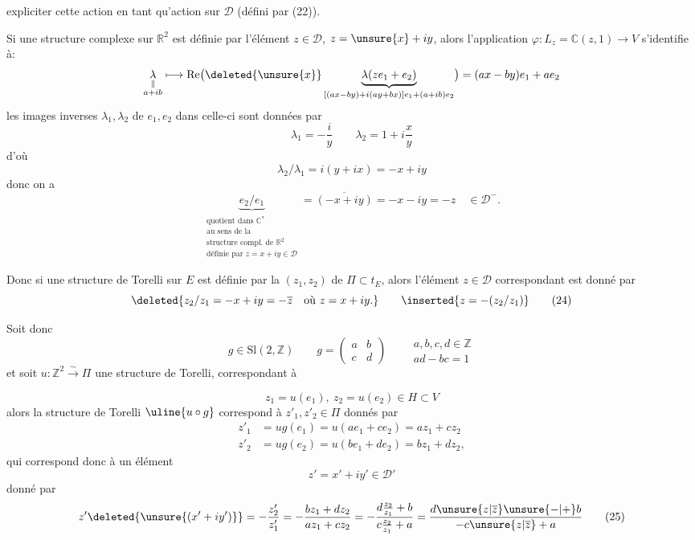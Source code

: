 expliciter cette action en tant qu'action sur $\mathcal D$ (défini par (22)).

Si une structure complexe sur $\mathbb R^2$ est définie par l'élément $z\in\mathcal D$, $z=\unsure{x}+iy$, alors l'application  $\varphi:L_z=\mathbb C(z,1)\longrightarrow V$ s'identifie à:
\[
\underset{\substack{\Vert\\a+ib}}{\lambda}\longmapsto
\operatorname{Re}\bigl(\deleted{\unsure{x}}\underbrace{\lambda(ze_1+e_2)}_{[(ax-by)+i(ay+bx)]e_1+(a+ib)e_2}\bigr)
=(ax-by)e_1+ae_2
\]
les images inverses $\lambda_1,\lambda_2$ de $e_1,e_2$ dans celle-ci sont données par
\[
\lambda_1=-\frac{i}{y}\qquad
\lambda_2=1+i\frac{x}{y}
\]
d'où
\[
\lambda_2/\lambda_1=i(y+ix)=-x+iy
\]
donc on a
\[
\underbrace{e_2/e_1}_{\substack{\text{quotient dans }\mathbb C^*\\
\text{au sens de la}\\
\text{structure compl. de }\mathbb R^2\\
\text{définie par }z=x+iy\in\mathcal D}}
=\overline{(-x+iy)}=-x-iy=-z
\quad\in\mathcal D^-.
\]

Donc si une structure de Torelli sur $E$ est définie par la  $(z_1,z_2)$ de $\Pi\subset t_E$, alors l'élément $z\in\mathcal D$ correspondant est donné par
\begin{equation}
\deleted{z_2/z_1=-x+iy=-\overline z\quad\text{où }z=x+iy.}
\qquad\inserted{z=-(z_2/z_1)}
\tag{24}
\end{equation}

Soit donc
\[
g\in\mathrm{Sl}(2,\mathbb Z)\qquad
g=\begin{pmatrix}a&b\\c&d\end{pmatrix}
\qquad
\begin{gathered}
a,b,c,d\in\mathbb Z\\
ad-bc=1
\end{gathered}
\]
et soit  $u:\mathbb Z^2\xrightarrow{\sim}\Pi$ une structure de Torelli, correspondant à

\[
z_1=u(e_1),\ z_2=u(e_2)\in H\subset V
\]
alors la structure de Torelli $\uline{u\circ g}$ correspond à $z'_1,z'_2\in\Pi$ donnés par
\[
\begin{aligned}
z'_1&=ug(e_1)=u(ae_1+ce_2)=az_1+cz_2\\
z'_2&=ug(e_2)=u(be_1+de_2)=bz_1+dz_2,
\end{aligned}
\]
qui correspond donc à un élément
\[
z'=x'+iy'\in\mathcal D'
\]
donné par
\begin{equation}
z'\deleted{\unsure{(x'+iy')}}=
-\frac{z'_2}{z'_1}
=-\frac{bz_1+dz_2}{az_1+cz_2}
=-\frac{d\frac{z_2}{z_1}+b}{c\frac{z_2}{z_1}+a}
=\frac{d\unsure{z|\overline z}\unsure{-|+}b}{-c\unsure{z|\overline z}+a}
\tag{25}
\end{equation}

